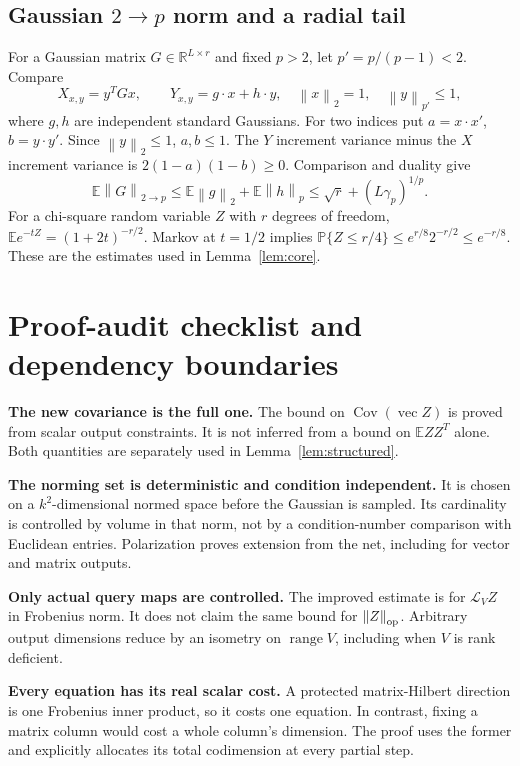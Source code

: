 \documentclass[11pt]{article}
\theoremstyle{remark}\newtheorem{remark}[theorem]{Remark}
\newcommand{\R}{\mathbb R}\newcommand{\E}{\mathbb E}\newcommand{\Prob}{\mathbb P}
\newcommand{\norm}[1]{\left\|#1\right\|}\newcommand{\ip}[2]{\left\langle #1,#2\right\rangle}
\begin{document}
\subsection[Gaussian matrix norm and a radial tail]{Gaussian $2\to p$ norm and a radial tail}
For a Gaussian matrix $G\in\R^{L\times r}$ and fixed $p>2$, let $p'=p/(p-1)<2$. Compare
\[
 X_{x,y}=y^TGx,\qquad Y_{x,y}=g\cdot x+h\cdot y,
 \quad\norm x_2=1,\quad\norm y_{p'}\le1,
\]
where $g,h$ are independent standard Gaussians. For two indices put $a=x\cdot x'$, $b=y\cdot y'$. Since $\norm y_2\le1$, $a,b\le1$. The $Y$ increment variance minus the $X$ increment variance is $2(1-a)(1-b)\ge0$. Comparison and duality give
\[
 \E\norm G_{2\to p}\le\E\norm g_2+\E\norm h_p
 \le\sqrt r+(L\gamma_p)^{1/p}.
\]
For a chi-square random variable $Z$ with $r$ degrees of freedom, $\E e^{-tZ}=(1+2t)^{-r/2}$. Markov at $t=1/2$ implies $\Prob\{Z\le r/4\}\le e^{r/8}2^{-r/2}\le e^{-r/8}$. These are the estimates used in Lemma~\ref{lem:core}.

\section{Proof-audit checklist and dependency boundaries}
\textbf{The new covariance is the full one.} The bound on $\operatorname{Cov}(\operatorname{vec}Z)$ is proved from scalar output constraints. It is not inferred from a bound on $\E ZZ^T$ alone. Both quantities are separately used in Lemma~\ref{lem:structured}.

\textbf{The norming set is deterministic and condition independent.} It is chosen on a $k^2$-dimensional normed space before the Gaussian is sampled. Its cardinality is controlled by volume in that norm, not by a condition-number comparison with Euclidean entries. Polarization proves extension from the net, including for vector and matrix outputs.

\textbf{Only actual query maps are controlled.} The improved estimate is for $\mathcal L_V Z$ in Frobenius norm. It does not claim the same bound for $\norm Z_{\op}$. Arbitrary output dimensions reduce by an isometry on $\operatorname{range}V$, including when $V$ is rank deficient.

\textbf{Every equation has its real scalar cost.} A protected matrix-Hilbert direction is one Frobenius inner product, so it costs one equation. In contrast, fixing a matrix column would cost a whole column's dimension. The proof uses the former and explicitly allocates its total codimension at every partial step.
\end{document}

